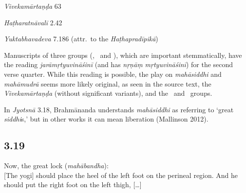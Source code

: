 \begin{ekdosis}
\begin{sources}[hp03_018]
\emph{Vivekamārtaṇḍa} 63
\begin{versinnote}
\end{versinnote}
\end{sources}

\begin{testimonia}[hp03_018]
\emph{Haṭharatnāvalī} 2.42
\begin{versinnote}
\end{versinnote}

\emph{Yuktabhavadeva} 7.186 (attr.~to the \emph{Haṭhapradīpikā})
\begin{versinnote}
\end{versinnote}
\end{testimonia}

\begin{philcomm}[hp03_018]
Manuscripts of three groups (\textalpha, \textbeta\ and \textgamma), which are important stemmatically, have the reading \emph{jarāmṛtyuvināśinī} (and  has \emph{nṛṇāṃ mṛtyuvināśinī}) for the second verse quarter. While this reading is possible, the play on \emph{mahāsiddhi} and \emph{mahāmudrā} seems more likely original, as seen in the source text, the \emph{Vivekamārtaṇḍa} (without significant variants), and the \texteta\ and \textepsilon\ groups. 

In \emph{Jyotsnā} 3.18, Brahmānanda understands \emph{mahāsiddhi} as referring to `great \emph{siddhi}s,' but in other works it can mean liberation (Mallinson 2012).
\end{philcomm}

\subsection*{3.19}
\begin{translation}[hp03_019]
Now, the great lock (\emph{mahābandha}):\\
{}[The yogi] should place the heel of the left foot on the perineal region. And he should put the right foot on the left thigh, [\dots]
\end{translation}


\end{ekdosis}
